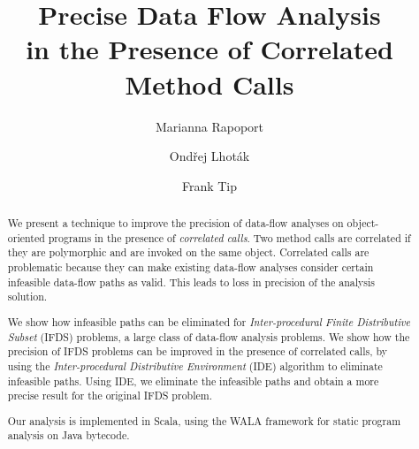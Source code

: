 \documentclass[runningheads,a4paper]{llncs}
\newcommand{\keywords}[1]{\par\addvspace\baselineskip
\noindent\keywordname\enspace\ignorespaces#1}
\begin{document}



\mainmatter  %

\title{Precise Data Flow Analysis\\in the Presence of Correlated Method Calls}

\author{
 Marianna Rapoport \and
 Ond\v{r}ej Lhot\'ak \and
 Frank Tip
}


\maketitle

\begin{abstract}
We present a technique to improve the precision of data-flow analyses on object-oriented programs in the presence of 	\textit{correlated calls}. Two method calls are correlated if they are polymorphic and are invoked on the same object. Correlated calls are problematic because they can make  existing data-flow analyses consider certain infeasible data-flow paths as valid. This leads to loss in precision of the analysis solution.

We show how infeasible paths can be eliminated for \textit{Inter-procedural Finite Distributive Subset} (IFDS) problems, a large class of data-flow analysis problems. We show how the precision of IFDS problems can be improved in the presence of correlated calls, by using the \textit{Inter-procedural Distributive Environment} (IDE) algorithm to eliminate infeasible paths.  Using IDE, we eliminate the infeasible paths and obtain a more precise result for the original IFDS problem.

Our analysis is implemented in Scala, using the WALA framework for static program analysis on Java bytecode.

\end{abstract}





%








\end{document}
